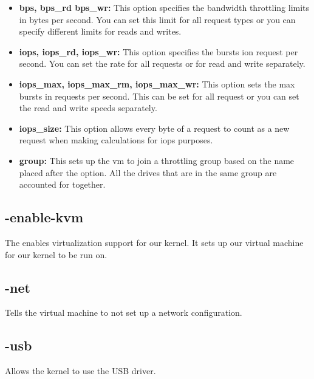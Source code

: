 \documentclass[draftclsnofoot, onecolumn, compsoc, 10pt]{IEEEtran}
\begin{document}
\begin{itemize}
            \item \textbf{bps, bps\_rd bps\_wr:} This option specifies the bandwidth throttling limits in bytes per second. You can set this limit for all request types or you can specify different limits for reads and writes.\\
			\item \textbf{iops, iops\_rd, iops\_wr:} This option specifies the bursts ion request per second. You can set the rate for all requests or for read and write separately.\\
			\item \textbf{iops\_max, iops\_max\_rm, iops\_max\_wr:} This option sets the max bursts in requests per second. This can be set for all request or you can set the read and write speeds separately.\\
			\item \textbf{iops\_size:} This option allows every byte of a request to count as a new request when making calculations for iops purposes.\\
			\item \textbf{group:} This sets up the vm to join a throttling group based on the name placed after the option. All the drives that are in the same group are accounted for together.\\
		\end{itemize}

	\subsection{-enable-kvm}

		The enables virtualization support for our kernel. It sets up our virtual machine for our kernel to be run on.

	\subsection{-net}
    Tells the virtual machine to not set up a network configuration.
	\subsection{-usb}
    Allows the kernel to use the USB driver.
\end{document}
